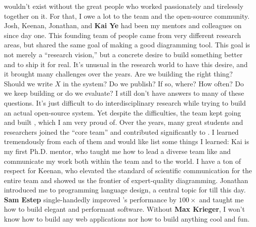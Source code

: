 \Penrose wouldn't exist without the great people who worked passionately and tirelessly together on it. For that, I owe a lot to the \Penrose team and the open-source community. Josh, Keenan, Jonathan, and \textbf{Kai Ye} had been my mentors and colleagues on \Penrose since day one. This founding team of people came from very different research areas, but shared the same goal of making a good diagramming tool. This goal is not merely a ``research vision,'' but a concrete desire to build something better and to ship it for real. It's unusual in the research world to have this desire, and it brought many challenges over the years. Are we building the right thing? Should we write $X$ in the system? Do we publish? If so, where? How often? Do we keep building or do we evaluate? I still don't have answers to many of these questions. It's just difficult to do interdisciplinary research while trying to build an actual open-source system. Yet despite the difficulties, the team kept going and built \Penrose, which I am very proud of. Over the years, many great students and researchers joined the ``core team'' and contributed significantly to \Penrose. I learned tremendously from each of them and would like list some things I learned: Kai is my first Ph.D. mentor, who taught me how to lead a diverse team like \Penrose and communicate my work both within the team and to the world. I have a ton of respect for Keenan, who elevated the standard of scientific communication for the entire team and showed us the frontier of expert-quality diagramming. Jonathan introduced me to programming language design, a central topic for \Penrose till this day. \textbf{Sam Estep} single-handedly improved \Penrose's performance by $100\times$ and taught me how to build elegant and performant software. Without \textbf{Max Krieger}, I won't know how to build any web applications nor how to build anything cool and fun. 

